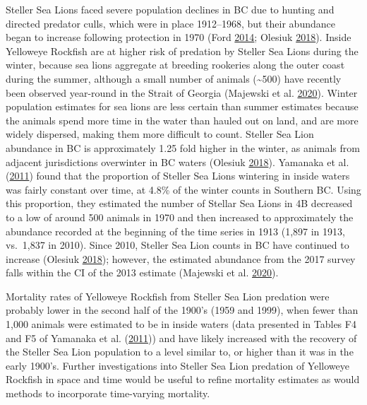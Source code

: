 \documentclass[11pt]{book}
\begin{document}
Steller Sea Lions faced severe population declines in BC due to hunting and directed predator culls, which were in place 1912--1968, but their abundance began to increase following protection in 1970 (Ford \protect\hyperlink{ref-ford2014}{2014}; Olesiuk \protect\hyperlink{ref-olesiuk2018}{2018}). Inside Yelloweye Rockfish are at higher risk of predation by Steller Sea Lions during the winter, because sea lions aggregate at breeding rookeries along the outer coast during the summer, although a small number of animals (\textasciitilde500) have recently been observed year-round in the Strait of Georgia (Majewski et al. \protect\hyperlink{ref-majewski2020}{2020}). Winter population estimates for sea lions are less certain than summer estimates because the animals spend more time in the water than hauled out on land, and are more widely dispersed, making them more difficult to count. Steller Sea Lion abundance in BC is approximately 1.25 fold higher in the winter, as animals from adjacent jurisdictions overwinter in BC waters (Olesiuk \protect\hyperlink{ref-olesiuk2018}{2018}). Yamanaka et al. (\protect\hyperlink{ref-yamanaka2011}{2011}) found that the proportion of Steller Sea Lions wintering in inside waters was fairly constant over time, at 4.8\% of the winter counts in Southern BC. Using this proportion, they estimated the number of Stellar Sea Lions in 4B decreased to a low of around 500 animals in 1970 and then increased to approximately the abundance recorded at the beginning of the time series in 1913 (1,897 in 1913, vs.~1,837 in 2010). Since 2010, Steller Sea Lion counts in BC have continued to increase (Olesiuk \protect\hyperlink{ref-olesiuk2018}{2018}); however, the estimated abundance from the 2017 survey falls within the CI of the 2013 estimate (Majewski et al. \protect\hyperlink{ref-majewski2020}{2020}).

Mortality rates of Yelloweye Rockfish from Steller Sea Lion predation were probably lower in the second half of the 1900's (1959 and 1999), when fewer than 1,000 animals were estimated to be in inside waters (data presented in Tables F4 and F5 of Yamanaka et al. (\protect\hyperlink{ref-yamanaka2011}{2011})) and have likely increased with the recovery of the Steller Sea Lion population to a level similar to, or higher than it was in the early 1900's. Further investigations into Steller Sea Lion predation of Yelloweye Rockfish in space and time would be useful to refine mortality estimates as would methods to incorporate time-varying mortality.


\clearpage
\end{document}
